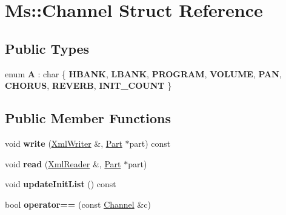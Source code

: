 \hypertarget{struct_ms_1_1_channel}{}\section{Ms\+:\+:Channel Struct Reference}
\label{struct_ms_1_1_channel}
\subsection*{Public Types}
\begin{DoxyCompactItemize}
\item 
\mbox{\label{struct_ms_1_1_channel_a514ee076dce4731bf26831a9edd63caf}} 
enum {\bfseries A} \+: char \{ \newline
{\bfseries H\+B\+A\+NK}, 
{\bfseries L\+B\+A\+NK}, 
{\bfseries P\+R\+O\+G\+R\+AM}, 
{\bfseries V\+O\+L\+U\+ME}, 
\newline
{\bfseries P\+AN}, 
{\bfseries C\+H\+O\+R\+US}, 
{\bfseries R\+E\+V\+E\+RB}, 
{\bfseries I\+N\+I\+T\+\_\+\+C\+O\+U\+NT}
 \}
\end{DoxyCompactItemize}
\subsection*{Public Member Functions}
\begin{DoxyCompactItemize}
\item 
\mbox{\label{struct_ms_1_1_channel_a46d7af5d4106973b29a33df402246ae6}} 
void {\bfseries write} (\hyperlink{class_ms_1_1_xml_writer}{Xml\+Writer} \&, \hyperlink{class_ms_1_1_part}{Part} $\ast$part) const
\item 
\mbox{\label{struct_ms_1_1_channel_a158196776f4389acfcc78891f37f88e6}} 
void {\bfseries read} (\hyperlink{class_ms_1_1_xml_reader}{Xml\+Reader} \&, \hyperlink{class_ms_1_1_part}{Part} $\ast$part)
\item 
\mbox{\label{struct_ms_1_1_channel_ac83381b25449cf8bb64f641a2b199eef}} 
void {\bfseries update\+Init\+List} () const
\item 
\mbox{\label{struct_ms_1_1_channel_a9159e0f2c6c7f8aa54a4b51f06e9165b}} 
bool {\bfseries operator==} (const \hyperlink{struct_ms_1_1_channel}{Channel} \&c)
\end{DoxyCompactItemize}
